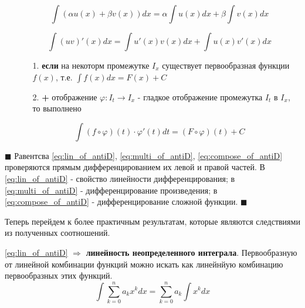 \documentclass[a4paper,14pt]{article} %
\begin{document}
    \begin{itemize}
        \item[\boxed{a.}]
            \begin{equation}\label{eq:lin_of_antiD}
                \int{(\alpha u(x) + \beta v(x))dx} = \alpha \int{u(x)dx} + \beta \int{v(x)dx}
            \end{equation}
        \item[\boxed{b.}]
            \begin{equation}\label{eq:multi_of_antiD}
                \int{(uv)'(x)dx} = \int{u'(x)v(x)dx} + \int{u(x)v'(x)dx}
            \end{equation}
        \item[\boxed{c.}] 
            \begin{itemize}
                \item[1.] \textbf{если} на некоторм промежутке \(I_x\) существует первообразная функции \(f(x)\), т.е. \(\int{f(x)dx} = F(x) + C\)
                
                \item[2.] \textbf{+} отображение \(\varphi : I_t \rightarrow I_x\) - гладкое\footnotemark{} отображение промежутка \(I_t\) в \(I_x\), то выполнено
            \end{itemize}
            \begin{equation}\label{eq:compose_of_antiD}
                \int{(f\circ\varphi)(t)\cdot\varphi'(t)dt} = (F\circ\varphi)(t) + C 
            \end{equation}
            
            
    \end{itemize}
    
    \noindent $\blacksquare$ Равентсва \eqref{eq:lin_of_antiD}, \eqref{eq:multi_of_antiD}, \eqref{eq:compose_of_antiD} проверяются прямым дифференцированием их левой и правой частей. В \eqref{eq:lin_of_antiD} - свойство линейности дифференцирования; в \eqref{eq:multi_of_antiD} - дифференцирование произведения; в \eqref{eq:compose_of_antiD} - дифференцирование сложной функции. $\blacksquare$
    
    \bigskip
    \noindent Теперь перейдем к более практичным результатам, которые являются следствиями из полученных соотношений.
    
    \bigskip \noindent
    \eqref{eq:lin_of_antiD} \( \Rightarrow \) \textbf{линейность неопределенного интеграла}. Первообразную от линейной комбинации функций можно искать как линейнйую комбинацию первообразных этих функций.
    \[
    \int{\sum_{k=0}^{n} {a_{k}x^{k}}dx} = \sum_{k=0}^{n}{a_k \int{x^kdx}}
    \]
    
\end{document}
